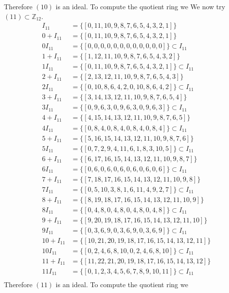 \documentclass[11pt]{amsart}
\begin{document}
Therefore $(10)$ is an ideal.
To compute the quotient ring we
We now try $(11) \subset \mathbb{Z}_{12}$.
\begin{equation*}
\begin{aligned}
I_11 &= \{[0, 11, 10, 9, 8, 7, 6, 5, 4, 3, 2, 1]\} \\
0+ I_11 &= \{[0, 11, 10, 9, 8, 7, 6, 5, 4, 3, 2, 1]\}\\
0 I_11 &= \{[0, 0, 0, 0, 0, 0, 0, 0, 0, 0, 0, 0]\} \subset I_11 \\
1+ I_11 &= \{[1, 12, 11, 10, 9, 8, 7, 6, 5, 4, 3, 2]\}\\
1 I_11 &= \{[0, 11, 10, 9, 8, 7, 6, 5, 4, 3, 2, 1]\} \subset I_11 \\
2+ I_11 &= \{[2, 13, 12, 11, 10, 9, 8, 7, 6, 5, 4, 3]\}\\
2 I_11 &= \{[0, 10, 8, 6, 4, 2, 0, 10, 8, 6, 4, 2]\} \subset I_11 \\
3+ I_11 &= \{[3, 14, 13, 12, 11, 10, 9, 8, 7, 6, 5, 4]\}\\
3 I_11 &= \{[0, 9, 6, 3, 0, 9, 6, 3, 0, 9, 6, 3]\} \subset I_11 \\
4+ I_11 &= \{[4, 15, 14, 13, 12, 11, 10, 9, 8, 7, 6, 5]\}\\
4 I_11 &= \{[0, 8, 4, 0, 8, 4, 0, 8, 4, 0, 8, 4]\} \subset I_11 \\
5+ I_11 &= \{[5, 16, 15, 14, 13, 12, 11, 10, 9, 8, 7, 6]\}\\
5 I_11 &= \{[0, 7, 2, 9, 4, 11, 6, 1, 8, 3, 10, 5]\} \subset I_11 \\
6+ I_11 &= \{[6, 17, 16, 15, 14, 13, 12, 11, 10, 9, 8, 7]\}\\
6 I_11 &= \{[0, 6, 0, 6, 0, 6, 0, 6, 0, 6, 0, 6]\} \subset I_11 \\
7+ I_11 &= \{[7, 18, 17, 16, 15, 14, 13, 12, 11, 10, 9, 8]\}\\
7 I_11 &= \{[0, 5, 10, 3, 8, 1, 6, 11, 4, 9, 2, 7]\} \subset I_11 \\
8+ I_11 &= \{[8, 19, 18, 17, 16, 15, 14, 13, 12, 11, 10, 9]\}\\
8 I_11 &= \{[0, 4, 8, 0, 4, 8, 0, 4, 8, 0, 4, 8]\} \subset I_11 \\
9+ I_11 &= \{[9, 20, 19, 18, 17, 16, 15, 14, 13, 12, 11, 10]\}\\
9 I_11 &= \{[0, 3, 6, 9, 0, 3, 6, 9, 0, 3, 6, 9]\} \subset I_11 \\
10+ I_11 &= \{[10, 21, 20, 19, 18, 17, 16, 15, 14, 13, 12, 11]\}\\
10 I_11 &= \{[0, 2, 4, 6, 8, 10, 0, 2, 4, 6, 8, 10]\} \subset I_11 \\
11+ I_11 &= \{[11, 22, 21, 20, 19, 18, 17, 16, 15, 14, 13, 12]\}\\
11 I_11 &= \{[0, 1, 2, 3, 4, 5, 6, 7, 8, 9, 10, 11]\} \subset I_11 \\
\end{aligned}
\end{equation*}
Therefore $(11)$ is an ideal.
To compute the quotient ring we
\end{document}
